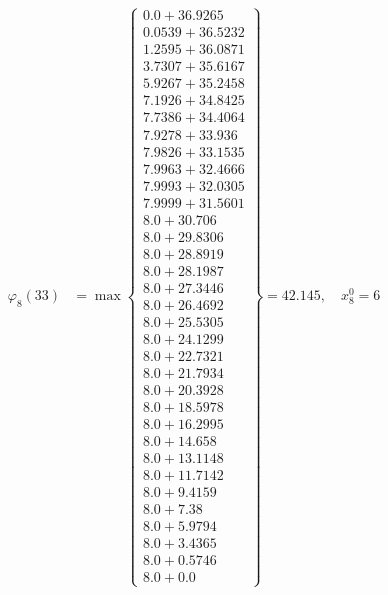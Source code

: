 \documentclass{article}
\begin{document}
\begin{align*}
  
\varphi_{8}(33) &= \max \left\{ \begin{array}{c}
0.0 + 36.9265 \\
 0.0539 + 36.5232 \\
 1.2595 + 36.0871 \\
 3.7307 + 35.6167 \\
 5.9267 + 35.2458 \\
 7.1926 + 34.8425 \\
 7.7386 + 34.4064 \\
 7.9278 + 33.936 \\
 7.9826 + 33.1535 \\
 7.9963 + 32.4666 \\
 7.9993 + 32.0305 \\
 7.9999 + 31.5601 \\
 8.0 + 30.706 \\
 8.0 + 29.8306 \\
 8.0 + 28.8919 \\
 8.0 + 28.1987 \\
 8.0 + 27.3446 \\
 8.0 + 26.4692 \\
 8.0 + 25.5305 \\
 8.0 + 24.1299 \\
 8.0 + 22.7321 \\
 8.0 + 21.7934 \\
 8.0 + 20.3928 \\
 8.0 + 18.5978 \\
 8.0 + 16.2995 \\
 8.0 + 14.658 \\
 8.0 + 13.1148 \\
 8.0 + 11.7142 \\
 8.0 + 9.4159 \\
 8.0 + 7.38 \\
 8.0 + 5.9794 \\
 8.0 + 3.4365 \\
 8.0 + 0.5746 \\
 8.0 + 0.0
\end{array} \right\}=42.145,\quad x_{8}^0=6\\
  
  
  

\end{align*}
\end{document}
